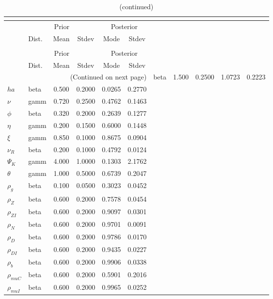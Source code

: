  
\begin{center}
\begin{longtable}{llcccc} 
\caption{Results from posterior maximization (parameters)}\\
 \label{Table:Posterior:1}\\
\toprule 
  & \multicolumn{3}{c}{Prior}  &  \multicolumn{2}{c}{Posterior} \\
  \cmidrule(r{.75em}){2-4} \cmidrule(r{.75em}){5-6}
  & Dist. & Mean  & Stdev & Mode & Stdev \\ 
\midrule \endfirsthead 
\caption{(continued)}\\
 \bottomrule 
  & \multicolumn{3}{c}{Prior}  &  \multicolumn{2}{c}{Posterior} \\
  \cmidrule(r{.75em}){2-4} \cmidrule(r{.75em}){5-6}
  & Dist. & Mean  & Stdev & Mode & Stdev \\ 
\midrule \endhead 
\bottomrule \multicolumn{6}{r}{(Continued on next page)}\endfoot 
\bottomrule\endlastfoot 
${\sigma}$ & beta &   1.500 & 0.2500 &   1.0723 &  0.2223 \\ 
${ha}$ & beta &   0.500 & 0.2000 &   0.0265 &  0.2770 \\ 
$\nu$ & gamm &   0.720 & 0.2500 &   0.4762 &  0.1463 \\ 
${\phi}$ & beta &   0.320 & 0.2000 &   0.2639 &  0.1277 \\ 
${\eta}$ & gamm &   0.200 & 0.1500 &   0.6000 &  0.1448 \\ 
$\xi$ & gamm &   0.850 & 0.1000 &   0.8675 &  0.0904 \\ 
${\nu_R}$ & beta &   0.200 & 0.1000 &   0.4792 &  0.0124 \\ 
${\Psi_{K}}$ & gamm &   4.000 & 1.0000 &   0.1303 &  2.1762 \\ 
${\theta}$ & gamm &   1.000 & 0.5000 &   0.6739 &  0.2047 \\ 
${\rho_g}$ & beta &   0.100 & 0.0500 &   0.3023 &  0.0452 \\ 
${\rho_Z}$ & beta &   0.600 & 0.2000 &   0.7578 &  0.0454 \\ 
${\rho_{ZI}}$ & beta &   0.600 & 0.2000 &   0.9097 &  0.0301 \\ 
${\rho_N}$ & beta &   0.600 & 0.2000 &   0.9701 &  0.0091 \\ 
${\rho_D}$ & beta &   0.600 & 0.2000 &   0.9786 &  0.0170 \\ 
${\rho_{DI}}$ & beta &   0.600 & 0.2000 &   0.9435 &  0.0227 \\ 
${\rho_b}$ & beta &   0.600 & 0.2000 &   0.9906 &  0.0338 \\ 
${\rho_{muC}}$ & beta &   0.600 & 0.2000 &   0.5901 &  0.2016 \\ 
${\rho_{muI}}$ & beta &   0.600 & 0.2000 &   0.9965 &  0.0252 \\ 
\end{longtable}
 \end{center}
